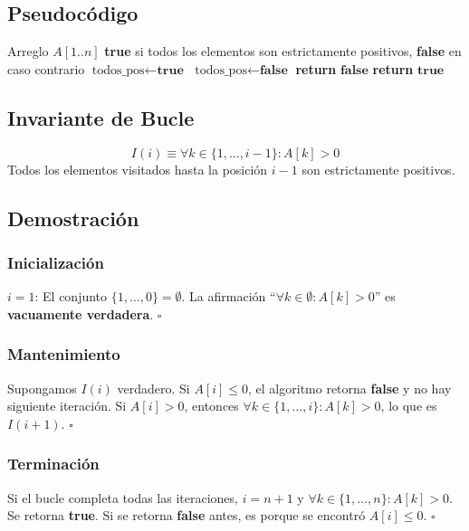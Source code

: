 \documentclass[11pt,a4paper]{article}
\newcommand{\inv}{I}
\begin{document}
\subsection{Pseudocódigo}
\begin{algorithm}[H]
\caption{Verificar Todos Positivos}
\begin{algorithmic}[1]
\Require Arreglo $A[1..n]$
\Ensure \textbf{true} si todos los elementos son estrictamente positivos, \textbf{false} en caso contrario
\State $\text{todos\_pos} \gets \textbf{true}$
        \State $\text{todos\_pos} \gets \textbf{false}$
        \State \textbf{return} $\textbf{false}$
    \EndIf
\EndFor
\State \textbf{return} $\textbf{true}$
\end{algorithmic}
\end{algorithm}

\subsection{Invariante de Bucle}
\[
\boxed{\inv(i) \equiv \forall k \in \{1, \ldots, i-1\}: A[k] > 0}
\]
Todos los elementos visitados hasta la posición $i-1$ son estrictamente positivos.

\subsection{Demostración}

\subsubsection{Inicialización}
$i = 1$: El conjunto $\{1, \ldots, 0\} = \emptyset$. La afirmación ``$\forall k \in \emptyset: A[k] > 0$'' es \textbf{vacuamente verdadera}. $\square$

\subsubsection{Mantenimiento}
Supongamos $\inv(i)$ verdadero. Si $A[i] \leq 0$, el algoritmo retorna \textbf{false} y no hay siguiente iteración. Si $A[i] > 0$, entonces $\forall k \in \{1, \ldots, i\}: A[k] > 0$, lo que es $\inv(i+1)$. $\square$

\subsubsection{Terminación}
Si el bucle completa todas las iteraciones, $i = n+1$ y $\forall k \in \{1, \ldots, n\}: A[k] > 0$. Se retorna \textbf{true}. Si se retorna \textbf{false} antes, es porque se encontró $A[i] \leq 0$. $\square$
\end{document}
